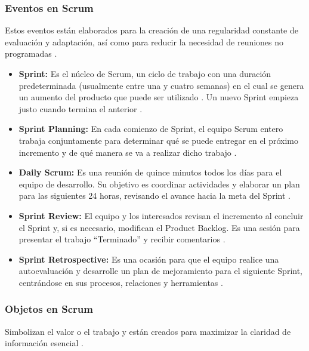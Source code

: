 \subsubsection{Eventos en Scrum}
Estos eventos están elaborados para la creación de una regularidad constante de evaluación y adaptación, así como para reducir la necesidad de reuniones no programadas \cite{schwaber2013guia}.
\begin{itemize}
    \item \textbf{Sprint: } Es el núcleo de Scrum, un ciclo de trabajo con una duración predeterminada (usualmente entre una y cuatro semanas) en el cual se genera un aumento del producto que puede ser utilizado \cite{dixit2019scrum}. Un nuevo Sprint empieza justo cuando termina el anterior \cite{schwaber2013guia}.
    \item \textbf{Sprint Planning: }En cada comienzo de Sprint, el equipo Scrum entero trabaja conjuntamente para determinar qué se puede entregar en el próximo incremento y de qué manera se va a realizar dicho trabajo \cite{schwaber2013guia}. 
    \item \textbf{Daily Scrum: }Es una reunión de quince minutos todos los días para el equipo de desarrollo. Su objetivo es coordinar actividades y elaborar un plan para las siguientes 24 horas, revisando el avance hacia la meta del Sprint \cite{schwaber2013guia}.
    \item \textbf{Sprint Review: }El equipo y los interesados revisan el incremento al concluir el Sprint y, si es necesario, modifican el Product Backlog. Es una sesión para presentar el trabajo ``Terminado'' y recibir comentarios \cite{dixit2019scrum}.
    \item \textbf{Sprint Retrospective: }Es una ocasión para que el equipo realice una autoevaluación y desarrolle un plan de mejoramiento para el siguiente Sprint, centrándose en sus procesos, relaciones y herramientas \cite{schwaber2013guia}.
\end{itemize}

\subsubsection{Objetos en Scrum}
Simbolizan el valor o el trabajo y están creados para maximizar la claridad de información esencial \cite{schwaber2013guia}.

